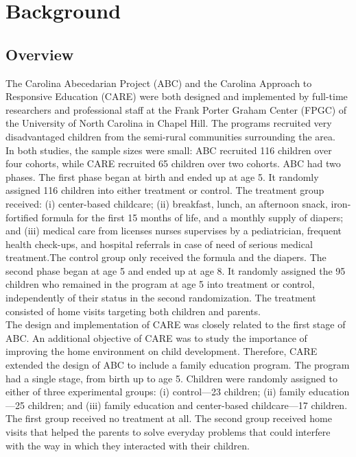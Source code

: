 \singlespacing
\pagebreak
\tableofcontents
\listoffigures
\listoftables
\pagebreak

\section{Background}
\subsection{Overview}

\noindent The Carolina Abecedarian Project (ABC) and the Carolina Approach to Responsive Education (CARE) were both designed and implemented by full-time researchers and professional staff at the Frank Porter Graham Center (FPGC) of the University of North Carolina in Chapel Hill. The programs recruited very disadvantaged children from the semi-rural communities surrounding the area.\\

\noindent In both studies, the sample sizes were small: ABC recruited 116 children over four cohorts, while CARE recruited 65 children over two cohorts. ABC had two phases. The first phase began at birth and ended up at age 5. It randomly assigned 116 children into either treatment or control. The treatment group received: (i) center-based childcare; (ii) breakfast, lunch, an afternoon snack, iron-fortified formula for the first 15 months of life, and a monthly supply of diapers; and (iii) medical care from licenses nurses supervises by a pediatrician, frequent health check-ups, and hospital referrals in case of need of serious medical treatment.The control group only received the formula and the diapers. The second phase began at age 5 and ended up at age 8. It randomly assigned the 95 children who remained in the program at age 5 into treatment or control, independently of their status in the second randomization. The treatment consisted of home visits targeting both children and parents.\\ 

\noindent The design and implementation of CARE was closely related to the first stage of ABC. An additional objective of CARE was to study the importance of improving the home environment on child development. Therefore, CARE extended the design of ABC to include a family education program. The program had a single stage, from birth up to age 5. Children were randomly assigned to either of three experimental groups: (i) control---23 children; (ii) family education---25 children; and (iii) family education and center-based childcare---17 children. The first group received no treatment at all. The second group received home visits that helped the parents to solve everyday problems that could interfere with the way in which they interacted with their children.\\

